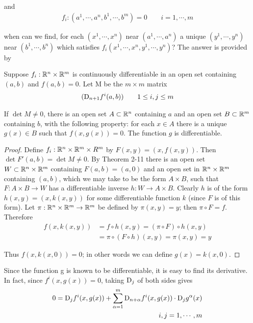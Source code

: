 and
\begin{align*}
    f_i:(a^1, \cdots, a^n, b^1, \cdots, b^m) = 0\qquad i=1, \cdots, m
\end{align*} 

when can we find, for each $(x^1,\cdots,x^n)$ near $(a^1,\cdots,a^n)$ a unique 
$(y^1,\cdots,y^n)$ near $(b^1,\cdots,b^n)$ which satisfies $f_i(x^1,\cdots,x^n, y^1,\cdots,y^n)$?
The answer is provided by 
\begin{theorem}
    Suppose $f_i:\mathbb{R}^n\times \mathbb{R}^m$ is continuously differentiable in an open set
    containing $(a,b)$ and $f(a,b) = 0$. Let M be the $m\times m$ matrix
    \begin{align*}
        (\mathrm{D}_{n+1}f^i(a, b))\qquad 1\le i,j\le m
    \end{align*}

    If  $\det M \neq 0$, there is an open set $A \subset \mathbb{R}^n$ containing $a$ 
    and an open set $B \subset \mathbb{R}^m$ containing $b$, with the following property: for
    each $x \in A$ there is a unique $g(x) \in B$ such that $f(x,g(x)) = 0$.
    The function $g$ is differentiable.
\end{theorem}

\begin{proof}
    Define $f_i:\mathbb{R}^n\times \mathbb{R}^m\times R^m$ by $F(x, y) = (x, f(x, y))$. Then 
    $\det F'(a, b) = \det M\neq 0$. By Theorem 2-11 there is an open set $W\subset \mathbb{R}^n\times \mathbb{R}^m$
    containing $F(a, b)=(a, 0)$ and an open set in $\mathbb{R}^n\times \mathbb{R}^m$ containing $(a, b)$, which
    we may take to be the form $A\times B$, such that $F:A\times B\to W$ has a differentiable inverse 
    $h:W\to A\times B$. Clearly $h$ is of the form $h(x, y) = (x, k(x, y))$ for some differentiable 
    function $k$ (since $F$ is of this form). Let $\pi: \mathbb{R}^n\times \mathbb{R}^m \to \mathbb{R}^m$ be defined 
    by $\pi(x, y) = y$; then $\pi\circ F = f$. Therefore 
    \begin{align*}
        f(x, k(x,y)) 
        & = f\circ h(x, y) = (\pi\circ F)\circ h(x, y) \\
        & = \pi\circ (F\circ h)(x, y) = \pi(x, y) = y
    \end{align*} 

    Thus $f(x, k(x, 0)) = 0$; in other words we can define $g(x) = k(x, 0)$.
\end{proof}

Since the function g is known to be differentiable, it is easy
to find its derivative. In fact, since $f^i(x,g(x)) = 0$, taking $\mathrm{D}_j$
of both sides gives 
\begin{align*}
    0 = \mathrm{D}_jf^i(x, g(x)) + \sum_{\alpha=1}^{m}{\mathrm{D}_{n+\alpha}f^i(x, g(x))\cdot \mathrm{D}_jg^\alpha(x)} \\
    i,j = 1, \cdots, m
\end{align*}

